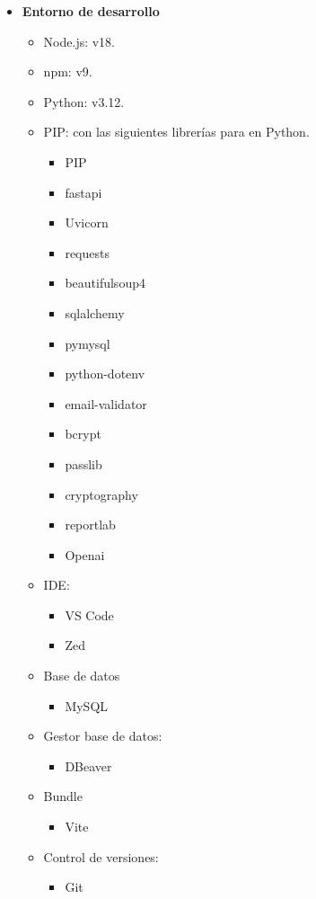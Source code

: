 \begin{itemize}
    \item \textbf{Entorno de desarrollo}
    \begin{itemize}
        \item Node.js: v18.
        \item npm: v9.
        \item Python: v3.12.
        \item PIP: con las siguientes librerías para en Python.
        \begin{itemize}
            \item PIP
            \item fastapi
            \item Uvicorn
            \item requests
            \item beautifulsoup4
            \item sqlalchemy
            \item pymysql
            \item python-dotenv
            \item email-validator
            \item bcrypt
            \item passlib
            \item cryptography
            \item reportlab
            \item Openai
        \end{itemize}
        \item IDE:
        \begin{itemize}
            \item VS Code
            \item Zed
        \end{itemize}
        \item Base de datos
        \begin{itemize}
            \item MySQL
        \end{itemize}
        \item Gestor base de datos:
        \begin{itemize}
            \item DBeaver
        \end{itemize}
        \item {Bundle}
        \begin{itemize}
            \item Vite
        \end{itemize}
        \item Control de versiones:
        \begin{itemize}
            \item Git
        \end{itemize}
    \end{itemize}
\end{itemize}
